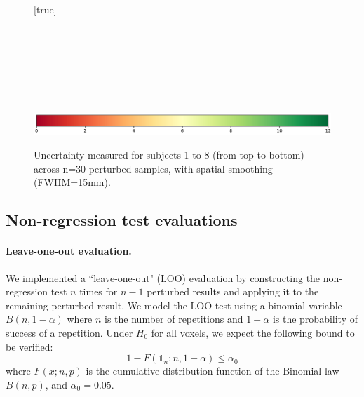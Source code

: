\documentclass{article}
\begin{document}
\begin{landscape}
    \begin{figure}
        \vspace*{-2cm}
        \centering
        [true] \\
         \\
         \\
         \\
         \\
         \\
         \\
         \\
        \includegraphics*[width=.7\linewidth]{figures/colorbar_sigbit.pdf}
        \caption{Uncertainty measured for subjects 1 to 8 (from top to bottom) across n=30 perturbed samples, with spatial smoothing (FWHM=15mm).}
        \label{fig:uncertainty-maps}

    \end{figure}
\end{landscape}

\subsection{Non-regression test evaluations}

\paragraph{Leave-one-out evaluation.} We implemented a ``leave-one-out" (LOO) evaluation by constructing the non-regression test $n$ times for $n-1$ perturbed results and applying it to the remaining perturbed result.
We model the LOO test using a binomial variable $B(n,1-\alpha)$ where $n$ is the number of repetitions and $1-\alpha$ is the probability of success of a repetition. Under $H_0$ for all voxels, we expect the following bound to be verified:
\[
    1-F(\mathds{1}_n;n,1-\alpha) \leq \alpha_0
\]
where $F(x;n,p)$ is the cumulative distribution function of the Binomial law $B(n,p)$, and $\alpha_0=0.05$.
\end{document}
